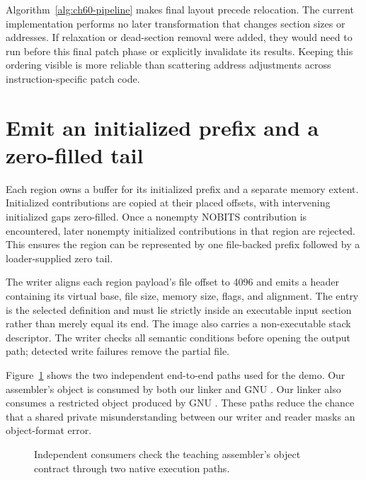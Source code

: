 Algorithm~\ref{alg:ch60-pipeline} makes final layout precede relocation.
The current implementation performs no later transformation that changes section sizes or addresses.
If relaxation or dead-section removal were added, they would need to run before this final patch phase or explicitly invalidate its results.
Keeping this ordering visible is more reliable than scattering address adjustments across instruction-specific patch code.

\section{Emit an initialized prefix and a zero-filled tail}
\label{sec:ch60-image}

Each region owns a buffer for its initialized prefix and a separate memory extent.
Initialized contributions are copied at their placed offsets, with intervening initialized gaps zero-filled.
Once a nonempty NOBITS contribution is encountered, later nonempty initialized contributions in that region are rejected.
This ensures the region can be represented by one file-backed prefix followed by a loader-supplied zero tail.

The writer aligns each region payload's file offset to 4096 and emits a  header containing its virtual base, file size, memory size, flags, and alignment.
The entry is the selected  definition and must lie strictly inside an executable input section rather than merely equal its end.
The image also carries a non-executable stack descriptor.
The writer checks all semantic conditions before opening the output path; detected write failures remove the partial file.

Figure~\ref{fig:ch60-pipeline} shows the two independent end-to-end paths used for the demo.
Our assembler's object is consumed by both our linker and GNU .
Our linker also consumes a restricted object produced by GNU .
These paths reduce the chance that a shared private misunderstanding between our writer and reader masks an object-format error.

\begin{figure}[htbp]
\centering
{}
\caption{Independent consumers check the teaching assembler's object contract through two native execution paths.}
\label{fig:ch60-pipeline}
\end{figure}

